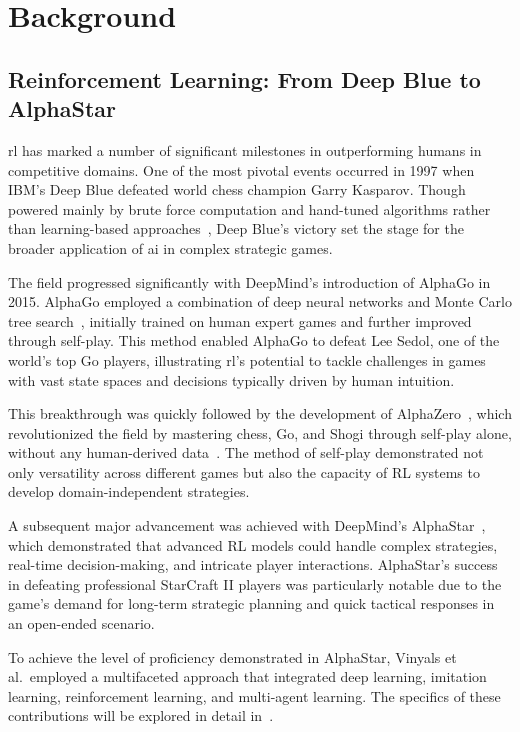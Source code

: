 \section{Background}%
\label{sec:background}

    \subsection*{Reinforcement Learning: From Deep Blue to AlphaStar}

\Gls{rl} has marked a number of significant milestones in outperforming humans in 
competitive domains. One of the most pivotal events occurred in 1997 
when IBM's Deep Blue defeated world chess champion Garry Kasparov. 
Though powered mainly by brute force computation and hand-tuned algorithms
rather than learning-based approaches~\cite{campbell2002}, Deep Blue's victory set 
the stage for the broader application of \gls{ai} in complex strategic games.

The field progressed significantly with DeepMind's introduction of AlphaGo in 2015. AlphaGo 
employed a combination of deep neural networks and Monte Carlo tree search~\cite{silver2016},
initially trained on human expert games and further improved through self-play.
This method enabled AlphaGo to defeat Lee Sedol, one of the world's top Go players, 
illustrating \gls{rl}'s potential to tackle challenges in games with vast state spaces and 
decisions typically driven by human intuition.

This breakthrough was quickly followed by the development of AlphaZero~\cite{silver2017},
which revolutionized the field by mastering chess, Go, and Shogi through self-play alone,
without any human-derived data~\cite{silver2017a}.
The method of self-play demonstrated not only versatility across different games but also the
capacity of RL systems to develop domain-independent strategies.

A subsequent major advancement was achieved with DeepMind's AlphaStar~\cite{vinyals2019},
which demonstrated that advanced RL models could handle complex strategies,
real-time decision-making, and intricate player interactions. AlphaStar's success in 
defeating professional StarCraft II players was particularly notable due to the game's demand 
for long-term strategic planning and quick tactical responses in an open-ended scenario.

To achieve the level of proficiency demonstrated in AlphaStar, Vinyals et al.~employed a 
multifaceted approach that integrated deep learning, imitation learning, reinforcement learning, 
and multi-agent learning. The specifics of these contributions will be explored in 
detail in~.


